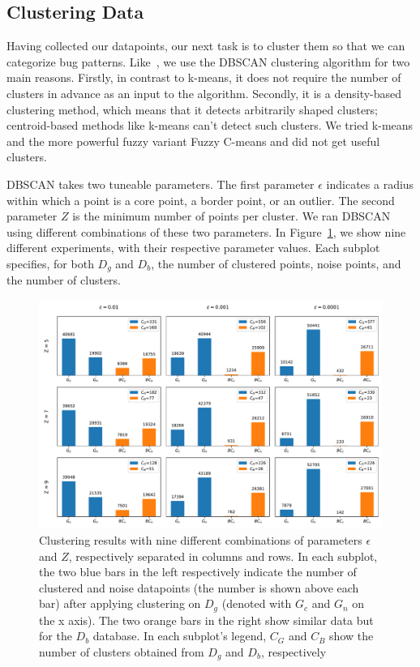 \subsection{\label{sec:clustering_data}Clustering Data}

Having collected our datapoints, our next task is to cluster them so that we can categorize bug patterns. Like~\cite{hanam2016discovering}, we use the DBSCAN clustering algorithm for two main reasons. Firstly, in contrast to k-means, it does not require the number of clusters in advance as an input to the algorithm. Secondly, it is a density-based clustering method, which means that it detects arbitrarily shaped clusters; centroid-based methods like k-means can't detect such clusters. We tried k-means and the more powerful fuzzy variant Fuzzy C-means \cite{dunn1973fuzzy} and did not get useful clusters.

DBSCAN takes two tuneable parameters. The first parameter $\epsilon$ indicates a radius within which a point is a core point, a border point, or an outlier. The second parameter $Z$ is the minimum number of points per cluster. We ran DBSCAN using different combinations of these two parameters. In Figure~\ref{fig:clustering}, we show nine different experiments, with their respective parameter values. Each subplot specifies, for both $D_g$ and $D_b$, the number of clustered points, noise points, and the number of clusters.

\begin{figure}[h]
\centering
\includegraphics[width=1\textwidth]{figs/clusters.pdf}
\caption{\label{fig:clustering} Clustering results with nine different combinations of parameters $\epsilon$ and $Z$, respectively separated in columns and rows. In each subplot, the two blue bars in the left respectively indicate the number of clustered and noise datapoints (the number is shown above each bar) after applying clustering on $D_g$ (denoted with $G_c$ and $G_n$ on the x axis). The two orange bars in the right show similar data but for the $D_{b}$ database. In each subplot's legend, $C_G$ and $C_B$ show the number of clusters obtained from $D_g$ and $D_b$, respectively}
\end{figure}

